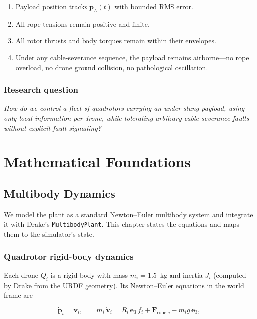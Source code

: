 \documentclass[11pt,a4paper,oneside]{report}
\newcommand{\rope}{\text{rope}}
\newcommand{\bp}{\bm{p}}
\newcommand{\bv}{\bm{v}}
\newcommand{\bF}{\bm{F}}
\newcommand{\be}{\bm{e}}
\begin{document}
\begin{enumerate}
\item Payload position tracks $\bar{\bp}_L(t)$ with bounded RMS error.
\item All rope tensions remain positive and finite.
\item All rotor thrusts and body torques remain within their
envelopes.
\item Under any cable-severance sequence, the payload remains
airborne---no rope overload, no drone ground collision, no
pathological oscillation.
\end{enumerate}

\section{Research question}

\begin{center}
\emph{How do we control a fleet of quadrotors carrying an under-slung
payload, using only local information per drone, while tolerating
arbitrary cable-severance faults without explicit fault signalling?}
\end{center}

\part{Mathematical Foundations}

\chapter{Multibody Dynamics}
\label{chap:dynamics}

We model the plant as a standard Newton--Euler multibody system and
integrate it with Drake's \texttt{MultibodyPlant}. This chapter
states the equations and maps them to the simulator's state.

\section{Quadrotor rigid-body dynamics}

\noindent Each drone $Q_i$ is a rigid body with mass $m_i=1.5$~kg and
inertia $J_i$ (computed by Drake from the URDF geometry). Its
Newton--Euler equations in the world frame are

\begin{equation}
\dot{\bp}_i = \bv_i, \qquad
m_i\, \dot{\bv}_i = R_i\, \be_3\, f_i + \bF_{\rope,i} - m_i g\, \be_3,
\label{eq:drone-trans}
\end{equation}
\end{document}
